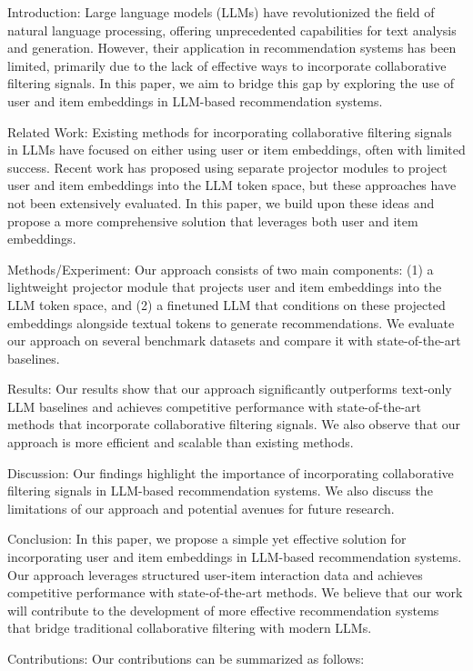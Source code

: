 Introduction:
Large language models (LLMs) have revolutionized the field of natural language processing, offering unprecedented capabilities for text analysis and generation. However, their application in recommendation systems has been limited, primarily due to the lack of effective ways to incorporate collaborative filtering signals. In this paper, we aim to bridge this gap by exploring the use of user and item embeddings in LLM-based recommendation systems.

Related Work:
Existing methods for incorporating collaborative filtering signals in LLMs have focused on either using user or item embeddings, often with limited success. Recent work has proposed using separate projector modules to project user and item embeddings into the LLM token space, but these approaches have not been extensively evaluated. In this paper, we build upon these ideas and propose a more comprehensive solution that leverages both user and item embeddings.

Methods/Experiment:
Our approach consists of two main components: (1) a lightweight projector module that projects user and item embeddings into the LLM token space, and (2) a finetuned LLM that conditions on these projected embeddings alongside textual tokens to generate recommendations. We evaluate our approach on several benchmark datasets and compare it with state-of-the-art baselines.

Results:
Our results show that our approach significantly outperforms text-only LLM baselines and achieves competitive performance with state-of-the-art methods that incorporate collaborative filtering signals. We also observe that our approach is more efficient and scalable than existing methods.

Discussion:
Our findings highlight the importance of incorporating collaborative filtering signals in LLM-based recommendation systems. We also discuss the limitations of our approach and potential avenues for future research.

Conclusion:
In this paper, we propose a simple yet effective solution for incorporating user and item embeddings in LLM-based recommendation systems. Our approach leverages structured user-item interaction data and achieves competitive performance with state-of-the-art methods. We believe that our work will contribute to the development of more effective recommendation systems that bridge traditional collaborative filtering with modern LLMs.

Contributions:
Our contributions can be summarized as follows:

